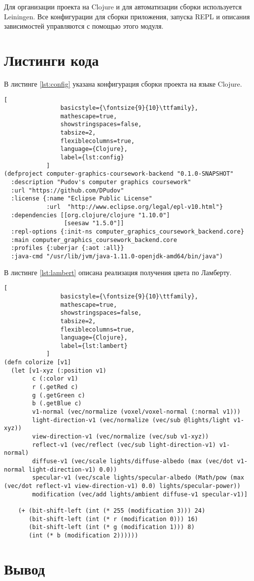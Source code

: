 Для организации проекта на Clojure и для автоматизации сборки используется Leiningen.
Все конфигурации для сборки приложения, запуска REPL и описания зависимостей управляются с помощью
этого модуля\cite{site:lein}.

\section{Листинги кода}

В листинге \ref{lst:config} указана конфигурация сборки проекта на языке Clojure.

\begin{lstlisting}[
                basicstyle={\fontsize{9}{10}\ttfamily},
                mathescape=true,
                showstringspaces=false,
                tabsize=2,
                flexiblecolumns=true,
                language={Clojure},
                label={lst:config}
            ]
(defproject computer-graphics-coursework-backend "0.1.0-SNAPSHOT"
  :description "Pudov's computer graphics coursework"
  :url "https://github.com/DPudov"
  :license {:name "Eclipse Public License"
            :url  "http://www.eclipse.org/legal/epl-v10.html"}
  :dependencies [[org.clojure/clojure "1.10.0"]
                 [seesaw "1.5.0"]]
  :repl-options {:init-ns computer_graphics_coursework_backend.core}
  :main computer_graphics_coursework_backend.core
  :profiles {:uberjar {:aot :all}}
  :java-cmd "/usr/lib/jvm/java-1.11.0-openjdk-amd64/bin/java")
\end{lstlisting}

В листинге \ref{lst:lambert} описана реализация получения цвета по Ламберту.

\begin{lstlisting}[
                basicstyle={\fontsize{9}{10}\ttfamily},
                mathescape=true,
                showstringspaces=false,
                tabsize=2,
                flexiblecolumns=true,
                language={Clojure},
                label={lst:lambert}
            ]
(defn colorize [v1]
  (let [v1-xyz (:position v1)
        c (:color v1)
        r (.getRed c)
        g (.getGreen c)
        b (.getBlue c)
        v1-normal (vec/normalize (voxel/voxel-normal (:normal v1)))
        light-direction-v1 (vec/normalize (vec/sub @lights/light v1-xyz))
        view-direction-v1 (vec/normalize (vec/sub v1-xyz))
        reflect-v1 (vec/reflect (vec/sub light-direction-v1) v1-normal)
        diffuse-v1 (vec/scale lights/diffuse-albedo (max (vec/dot v1-normal light-direction-v1) 0.0))
        specular-v1 (vec/scale lights/specular-albedo (Math/pow (max (vec/dot reflect-v1 view-direction-v1) 0.0) lights/specular-power))
        modification (vec/add lights/ambient diffuse-v1 specular-v1)]

    (+ (bit-shift-left (int (* 255 (modification 3))) 24)
       (bit-shift-left (int (* r (modification 0))) 16)
       (bit-shift-left (int (* g (modification 1))) 8)
       (int (* b (modification 2))))))
\end{lstlisting}


\section{Вывод}

